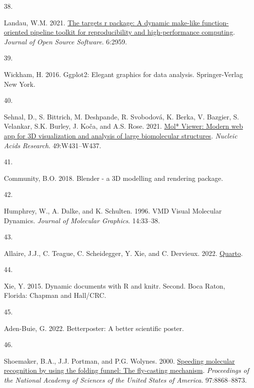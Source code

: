 \documentclass[
  letterpaper,
  DIV=11,
  numbers=noendperiod]{scrartcl}
\newlength{\cslhangindent}
\newlength{\csllabelwidth}
\newlength{\cslentryspacingunit} %
\newenvironment{CSLReferences}[2] %
 {%
  \setlength{\parindent}{0pt}
  \ifodd #1
  \let\oldpar\par
  \def\par{\hangindent=\cslhangindent\oldpar}
  \fi
  \setlength{\parskip}{#2\cslentryspacingunit}
 }%
 {}
\newcommand{\CSLLeftMargin}[1]{\parbox[t]{\csllabelwidth}{#1}}
\newcommand{\CSLRightInline}[1]{\parbox[t]{\linewidth - \csllabelwidth}{#1}\break}
\begin{document}
\begin{CSLReferences}{0}{0}
\leavevmode{}%
\CSLLeftMargin{38. }%
\CSLRightInline{Landau, W.M. 2021.
\href{https://doi.org/10.21105/joss.02959}{The targets r package: A
dynamic make-like function-oriented pipeline toolkit for reproducibility
and high-performance computing}. \emph{Journal of Open Source Software}.
6:2959.}

\leavevmode{}%
\CSLLeftMargin{39. }%
\CSLRightInline{Wickham, H. 2016. Ggplot2: {Elegant} graphics for data
analysis. {Springer-Verlag New York}.}

\leavevmode{}%
\CSLLeftMargin{40. }%
\CSLRightInline{Sehnal, D., S. Bittrich, M. Deshpande, R. Svobodová, K.
Berka, V. Bazgier, S. Velankar, S.K. Burley, J. Koča, and A.S. Rose.
2021. \href{https://doi.org/10.1093/nar/gkab314}{Mol* {Viewer}: Modern
web app for {3D} visualization and analysis of large biomolecular
structures}. \emph{Nucleic Acids Research}. 49:W431--W437.}

\leavevmode{}%
\CSLLeftMargin{41. }%
\CSLRightInline{Community, B.O. 2018. Blender - a {3D} modelling and
rendering package.}

\leavevmode{}%
\CSLLeftMargin{42. }%
\CSLRightInline{Humphrey, W., A. Dalke, and K. Schulten. 1996. {VMD}
\textendash{} {Visual Molecular Dynamics}. \emph{Journal of Molecular
Graphics}. 14:33--38.}

\leavevmode{}%
\CSLLeftMargin{43. }%
\CSLRightInline{Allaire, J.J., C. Teague, C. Scheidegger, Y. Xie, and C.
Dervieux. 2022. \href{https://doi.org/10.5281/zenodo.5960048}{Quarto}.}

\leavevmode{}%
\CSLLeftMargin{44. }%
\CSLRightInline{Xie, Y. 2015. Dynamic documents with {R} and knitr.
Second. {Boca Raton, Florida}: {Chapman and Hall/CRC}.}

\leavevmode{}%
\CSLLeftMargin{45. }%
\CSLRightInline{Aden-Buie, G. 2022. Betterposter: {A} better scientific
poster.}

\leavevmode{}%
\CSLLeftMargin{46. }%
\CSLRightInline{Shoemaker, B.A., J.J. Portman, and P.G. Wolynes. 2000.
\href{https://doi.org/10.1073/pnas.160259697}{Speeding molecular
recognition by using the folding funnel: The fly-casting mechanism}.
\emph{Proceedings of the National Academy of Sciences of the United
States of America}. 97:8868--8873.}


\end{CSLReferences}
\end{document}
